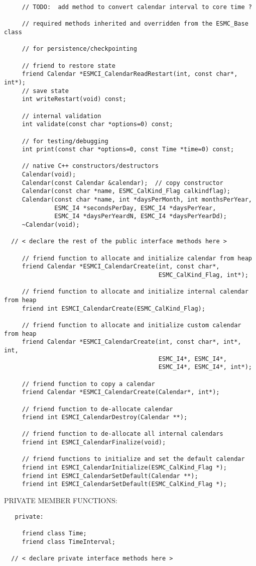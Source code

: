 \begin{verbatim}
     // TODO:  add method to convert calendar interval to core time ?
 
     // required methods inherited and overridden from the ESMC_Base class
 
     // for persistence/checkpointing
 
     // friend to restore state
     friend Calendar *ESMCI_CalendarReadRestart(int, const char*, int*);
     // save state
     int writeRestart(void) const;
 
     // internal validation
     int validate(const char *options=0) const;
 
     // for testing/debugging
     int print(const char *options=0, const Time *time=0) const;
 
     // native C++ constructors/destructors
     Calendar(void);
     Calendar(const Calendar &calendar);  // copy constructor
     Calendar(const char *name, ESMC_CalKind_Flag calkindflag);
     Calendar(const char *name, int *daysPerMonth, int monthsPerYear,
              ESMC_I4 *secondsPerDay, ESMC_I4 *daysPerYear,
              ESMC_I4 *daysPerYeardN, ESMC_I4 *daysPerYearDd);
     ~Calendar(void);
 
  // < declare the rest of the public interface methods here >
 
     // friend function to allocate and initialize calendar from heap
     friend Calendar *ESMCI_CalendarCreate(int, const char*,
                                           ESMC_CalKind_Flag, int*);
 
     // friend function to allocate and initialize internal calendar from heap
     friend int ESMCI_CalendarCreate(ESMC_CalKind_Flag);
 
     // friend function to allocate and initialize custom calendar from heap
     friend Calendar *ESMCI_CalendarCreate(int, const char*, int*, int,
                                           ESMC_I4*, ESMC_I4*,
                                           ESMC_I4*, ESMC_I4*, int*);
 
     // friend function to copy a calendar
     friend Calendar *ESMCI_CalendarCreate(Calendar*, int*);
 
     // friend function to de-allocate calendar
     friend int ESMCI_CalendarDestroy(Calendar **);
 
     // friend function to de-allocate all internal calendars
     friend int ESMCI_CalendarFinalize(void);
     
     // friend functions to initialize and set the default calendar
     friend int ESMCI_CalendarInitialize(ESMC_CalKind_Flag *);
     friend int ESMCI_CalendarSetDefault(Calendar **);
     friend int ESMCI_CalendarSetDefault(ESMC_CalKind_Flag *);
 \end{verbatim}{\sf PRIVATE MEMBER FUNCTIONS:}
\begin{verbatim}   private:
 
     friend class Time;
     friend class TimeInterval;
 
  // < declare private interface methods here >\end{verbatim}

\setlength{\parskip}{\oldparskip}
\setlength{\parindent}{\oldparindent}
\setlength{\baselineskip}{\oldbaselineskip}
